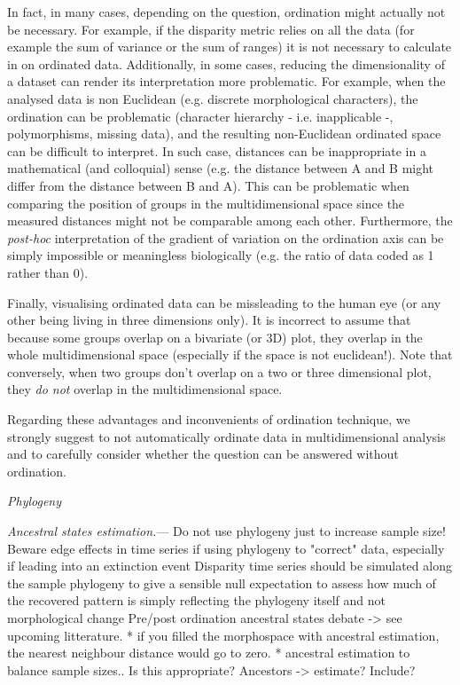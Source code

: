 \documentclass[12pt,letterpaper]{article}
\renewcommand{\subsection}[1]{%
\bigskip
\begin{center}
\begin{large}
\normalfont\itshape #1
\end{large}
\end{center}}
\renewcommand{\subsubsection}[1]{%
\vspace{2ex}
\noindent
\textit{#1.}---}
\begin{document}
In fact, in many cases, depending on the question, ordination might actually not be necessary.
For example, if the disparity metric relies on all the data (for example the sum of variance or the sum of ranges) it is not necessary to calculate in on ordinated data.
Additionally, in some cases, reducing the dimensionality of a dataset can render its interpretation more problematic.
For example, when the analysed data is non Euclidean (e.g. discrete morphological characters), the ordination can be problematic (character hierarchy - i.e. inapplicable -, polymorphisms, missing data), and the resulting non-Euclidean ordinated space can be difficult to interpret.
In such case, distances can be inappropriate in a mathematical (and colloquial) sense (e.g. the distance between A and B might differ from the distance between B and A).
This can be problematic when comparing the position of groups in the multidimensional space since the measured distances might not be comparable among each other.
Furthermore, the \textit{post-hoc} interpretation of the gradient of variation on the ordination axis can be simply impossible or meaningless biologically (e.g. the ratio of data coded as 1 rather than 0).

Finally, visualising ordinated data can be missleading to the human eye (or any other being living in three dimensions only).
It is incorrect to assume that because some groups overlap on a bivariate (or 3D) plot, they overlap in the whole multidimensional space (especially if the space is not euclidean!).
Note that conversely, when two groups don't overlap on a two or three dimensional plot, they \textit{do not} overlap in the multidimensional space.

Regarding these advantages and inconvenients of ordination technique, we strongly suggest to not automatically ordinate data in multidimensional analysis and to carefully consider whether the question can be answered without ordination.



\subsection{Phylogeny}
\subsubsection{Ancestral states estimation}
Do not use phylogeny just to increase sample size!
Beware edge effects in time series if using phylogeny to "correct" data, especially if leading into an extinction event
Disparity time series should be simulated along the sample phylogeny to give a sensible null expectation to assess how much of the recovered pattern is simply reflecting the phylogeny itself and not morphological change
Pre/post ordination ancestral states debate -> see upcoming litterature.
* if you filled the morphospace with ancestral estimation, the nearest neighbour distance would go to zero. 
* ancestral estimation to balance sample sizes.. Is this appropriate?
Ancestors -> estimate? Include?
\end{document}
